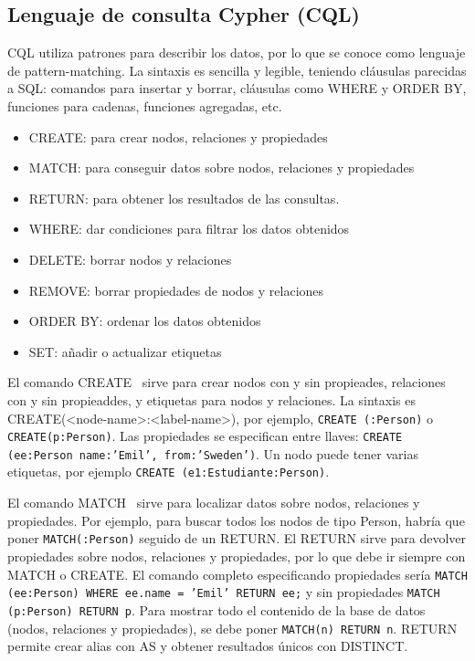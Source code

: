 \subsection{Lenguaje de consulta Cypher (CQL)}
CQL utiliza patrones para describir los datos, por lo que se conoce como lenguaje de pattern-matching. La sintaxis es sencilla y legible, teniendo cláusulas parecidas a SQL: comandos para insertar y borrar, cláusulas como WHERE y ORDER BY, funciones para cadenas, funciones agregadas, etc.
\begin{itemize}
\item CREATE: para crear nodos, relaciones y propiedades
\item MATCH: para conseguir datos sobre nodos, relaciones y propiedades
\item RETURN: para obtener los resultados de las consultas.
\item WHERE: dar condiciones para filtrar los datos obtenidos
\item DELETE: borrar nodos y relaciones
\item REMOVE: borrar propiedades de nodos y relaciones
\item ORDER BY: ordenar los datos obtenidos
\item SET: añadir o actualizar etiquetas
\end{itemize}

El comando CREATE   \ sirve para crear nodos con y sin propieades, relaciones con y sin propieaddes, y etiquetas para nodos y relaciones. La sintaxis es CREATE(<node-name>:<label-name>), por ejemplo, \texttt{CREATE (:Person)} o \texttt{CREATE(p:Person)}. Las propiedades se especifican entre llaves: \texttt{CREATE (ee:Person {name:'Emil', from:'Sweden'})}. Un nodo puede tener varias etiquetas, por ejemplo \texttt{CREATE (e1:Estudiante:Person)}.

El comando MATCH   \ sirve para localizar datos sobre nodos, relaciones y propiedades. Por ejemplo, para buscar todos los nodos de tipo Person, habría que poner \texttt{MATCH(:Person)} seguido de un RETURN. El RETURN sirve para devolver propiedades sobre nodos, relaciones y propiedades, por lo que debe ir siempre con MATCH o CREATE. El comando completo especificando propiedades sería \texttt{MATCH (ee:Person) WHERE ee.name = 'Emil' RETURN ee;} y sin propiedades \texttt{MATCH (p:Person) RETURN p}. Para mostrar todo el contenido de la base de datos (nodos, relaciones y propiedades), se debe poner \texttt{MATCH(n) RETURN n}. RETURN permite crear alias con AS y obtener resultados únicos con DISTINCT. 

